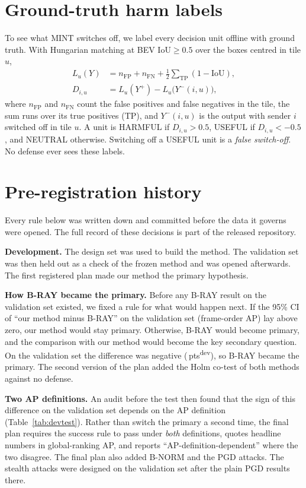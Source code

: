 \documentclass[conference]{IEEEtran}
\newcommand{\mint}{MINT}
\newcommand{\pts}{\,pts}
\newcommand{\dev}{\textsuperscript{dev}}
\begin{document}
\section{Ground-truth harm labels}
\label{app:extra}
To see what \mint{} switches off, we label every decision unit offline
with ground truth. With Hungarian matching at BEV IoU${}\ge 0.5$ over the boxes centred in tile $u$,
\begin{equation}
\begin{split}
L_u(Y)&=n_{\mathrm{FP}}+n_{\mathrm{FN}}+\tfrac12\textstyle\sum_{\mathrm{TP}}(1-\mathrm{IoU}),\\
D_{i,u}&=L_u(Y^{+})-L_u\big(Y^{-}(i,u)\big),
\end{split}
\label{eq:harm}
\end{equation}
where $n_{\mathrm{FP}}$ and $n_{\mathrm{FN}}$ count the false positives and false negatives in the tile, the
sum runs over its true positives (TP), and $Y^{-}(i,u)$
is the output with sender $i$ switched off in tile $u$. A unit is HARMFUL if $D_{i,u}>0.5$, USEFUL if
$D_{i,u}<-0.5$, and NEUTRAL otherwise. Switching off a USEFUL unit is a \emph{false switch-off}. No defense ever
sees these labels.
\FloatBarrier

\section{Pre-registration history}
\label{app:prereg}
Every rule below was written down and committed before the data it governs were opened. The full record of
these decisions is part of the released repository.

\textbf{Development.} The design set was used to build the method. The validation set was then held out as a
check of the frozen method and was opened afterwards. The first registered plan made our method the primary
hypothesis.

\textbf{How B-RAY became the primary.} Before any B-RAY result on the validation set existed, we fixed a rule
for what would happen next. If the 95\% CI of ``our method minus B-RAY'' on the validation set (frame-order AP)
lay above zero, our method would stay primary. Otherwise, B-RAY would become primary, and the comparison with
our method would become the key secondary question. On the validation set the difference was negative
(\DevHFrameRmB\pts\dev), so B-RAY became the primary. The second version of the plan added the Holm co-test of
both methods against no defense.

\textbf{Two AP definitions.} An audit before the test then found that the sign of this difference on the
validation set depends on the AP definition (Table~\ref{tab:devtest}). Rather than switch the primary a second
time, the final plan requires the success rule to pass under \emph{both} definitions, quotes headline numbers in
global-ranking AP, and reports ``AP-definition-dependent'' where the two disagree. The final plan also added
B-NORM and the PGD attacks. The stealth attacks were designed on the validation set after the plain PGD results
there.
\end{document}
